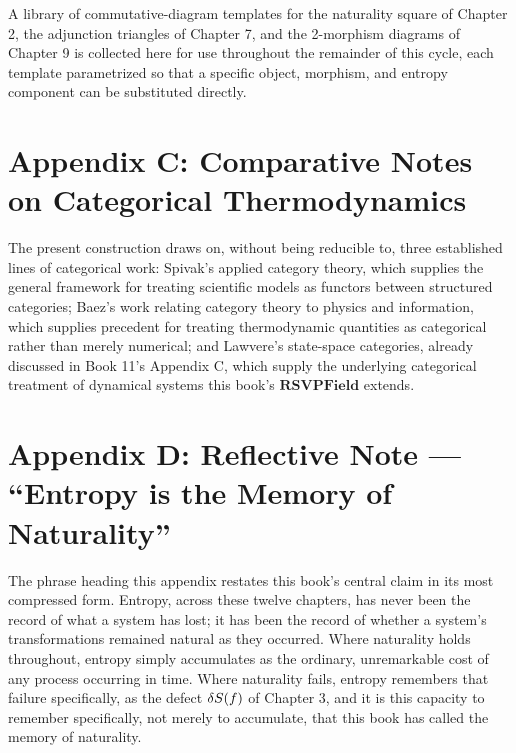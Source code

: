 A library of commutative-diagram templates for the naturality square of Chapter 2, the adjunction triangles of Chapter 7, and the 2-morphism diagrams of Chapter 9 is collected here for use throughout the remainder of this cycle, each template parametrized so that a specific object, morphism, and entropy component can be substituted directly.

\chapter*{Appendix C: Comparative Notes on Categorical Thermodynamics}

The present construction draws on, without being reducible to, three established lines of categorical work: Spivak's applied category theory, which supplies the general framework for treating scientific models as functors between structured categories; Baez's work relating category theory to physics and information, which supplies precedent for treating thermodynamic quantities as categorical rather than merely numerical; and Lawvere's state-space categories, already discussed in Book 11's Appendix C, which supply the underlying categorical treatment of dynamical systems this book's $\mathbf{RSVPField}$ extends.

\chapter*{Appendix D: Reflective Note --- ``Entropy is the Memory of Naturality''}

The phrase heading this appendix restates this book's central claim in its most compressed form. Entropy, across these twelve chapters, has never been the record of what a system has lost; it has been the record of whether a system's transformations remained natural as they occurred. Where naturality holds throughout, entropy simply accumulates as the ordinary, unremarkable cost of any process occurring in time. Where naturality fails, entropy remembers that failure specifically, as the defect $\delta S(f)$ of Chapter 3, and it is this capacity to remember specifically, not merely to accumulate, that this book has called the memory of naturality.
